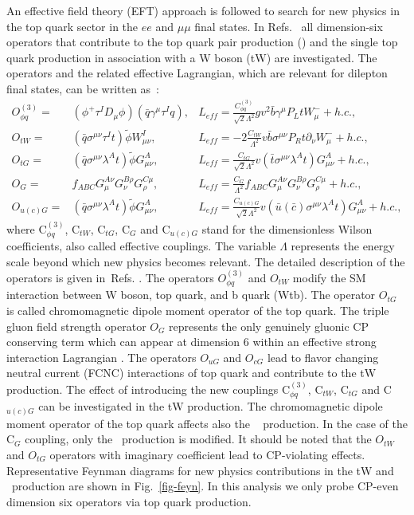 An effective field theory (EFT) approach is followed to search for new physics in the top quark sector in the $ee$ and $\mu\mu$ final states.
In Refs.~\cite{Zhang:2010dr,Durieux:2014xla} all dimension-six
operators that contribute to the top quark pair production (\ttbar) and the single top quark production in association with a W boson (tW)
are investigated. The operators and the related effective Lagrangian, which are relevant for dilepton final states, can be written as~\cite{Grzadkowski:2010es}:
\begin{eqnarray}
\label{eq1}
O_{\phi q}^{(3)} =& (\phi^+\tau^ID_\mu\phi)(\bar{q}\gamma^\mu\tau^Iq)  ,& L_\mathit{eff}=\frac{C_{\phi q}^{(3)}}{{\sqrt 2}\Lambda^2} gv^2\bar{b}\gamma^\mu P_LtW^-_\mu+h.c.,\\
O_{tW} =& (\bar{q}\sigma^{\mu\nu}\tau^It)\tilde{\phi}W^I_{\mu\nu} ,& L_\mathit{eff}=-2\frac{C_{tW}}{\Lambda^2}v\bar{b}\sigma^{\mu\nu}P_Rt \partial_\nu W^-_\mu+h.c.,\\
O_{tG} =& (\bar{q}\sigma^{\mu\nu}\lambda^A t)\tilde{\phi}G^A_{\mu\nu} ,& L_\mathit{eff}= \frac{C_{tG}}{{\sqrt 2}\Lambda^2}v\left(\bar{t}\sigma^{\mu\nu}\lambda^A t\right) G_{\mu\nu}^A +h.c.,\\
O_{G} =& f_{ABC}G^{A\nu}_\mu G^{B\rho}_\nu G^{C\mu}_\rho ,& L_\mathit{eff}= \frac{C_{G}}{\Lambda^2} f_{ABC}G^{A\nu}_\mu G^{B\rho}_\nu G^{C\mu}_\rho + h.c.,\\
O_{u(c)G} =&  (\bar{q}\sigma^{\mu\nu}\lambda^A t)\tilde{\phi}G^A_{\mu\nu}  ,& L_\mathit{eff}= \frac{C_{u(c)G}}{{\sqrt 2}\Lambda^2}v\left(\bar{u} \left(\bar{c}\right)\sigma^{\mu\nu}\lambda^A t\right) G_{\mu\nu}^A+h.c.,
\end{eqnarray}
where C$_{\phi q}^{(3)}$, C$_{tW}$, C$_{tG}$, C$_{G}$ and C$_{u(c)G}$ stand for the dimensionless Wilson coefficients, also called effective couplings.
The variable $\Lambda$ represents the energy scale beyond which new physics becomes relevant. The detailed description of the operators is given in~Refs. \cite{Zhang:2010dr,Durieux:2014xla}.
The operators $O_{\phi q}^{(3)}$ and $O_{tW}$ modify the SM interaction between W boson, top quark, and b quark (Wtb).
The operator $O_{tG}$ is called chromomagnetic dipole moment operator of the top quark.
The triple gluon field strength operator $O_G$ represents the only genuinely gluonic CP conserving term which can appear at dimension 6 within an effective strong interaction Lagrangian \cite{Cho:1994yu}.
The operators $O_{uG}$ and $O_{cG}$ lead to flavor changing neutral current (FCNC) interactions of top quark and contribute to the tW production.
The effect of introducing the new couplings C$_{\phi q}^{(3)}$, C$_{tW}$, C$_{tG}$ and C$_{u(c)G}$ can be investigated in the tW production. The chromomagnetic dipole moment operator of the top quark affects also the \ttbar ~ production. In the case of the C$_{G}$ coupling, only the \ttbar ~production is modified.
It should be noted that the $O_{tW}$ and $O_{tG}$ operators with imaginary coefficient lead to CP-violating effects.
Representative Feynman diagrams for new physics contributions in the tW and \ttbar ~production are shown in Fig.~\ref{fig-feyn}.
In this analysis we only probe CP-even dimension six operators via top quark production.

